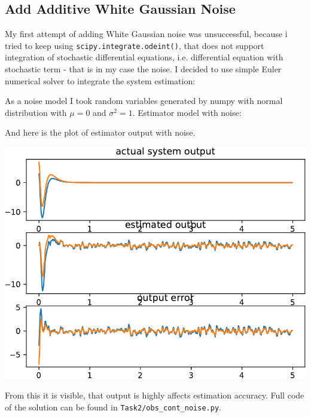 \documentclass[a4paper,12pt]{article}
\begin{document}
\subsection{Add Additive White Gaussian Noise}
My first attempt of adding White Gaussian noise was unsuccessful, because i tried
to keep using \texttt{scipy.integrate.odeint()}, that does not support integration
of stochastic differential equations, i.e. differential equation with stochastic 
term - that is in my case the noise.
I decided to use simple Euler numerical solver to integrate the system estimation:

As a noise model I took random variables generated by numpy with normal distribution
with $\mu=0$ and $\sigma^2=1$. Estimator model with noise:

And here is the plot of estimator output with noise.
\begin{center}
    \includegraphics[width=\linewidth]{../Task2/est_cont_noise_out.pdf}
\end{center}
From this it is visible, that output is highly affects estimation accuracy. Full
code of the solution can be found in \texttt{Task2/obs\_cont\_noise.py}.
\end{document}
